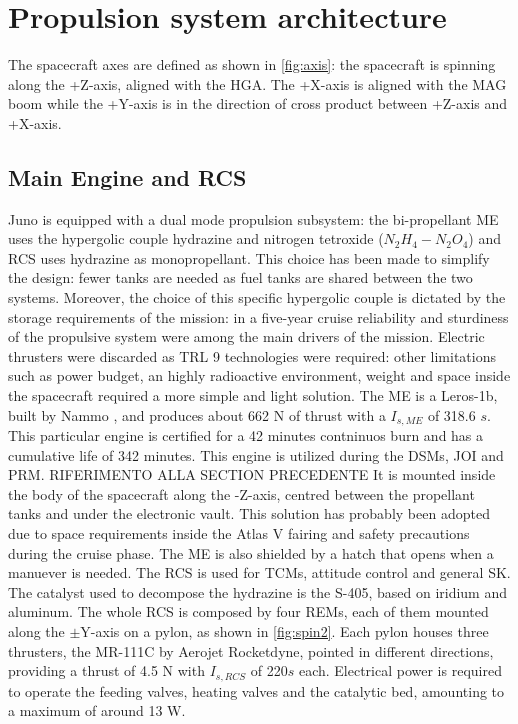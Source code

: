 \section{Propulsion system architecture}
\label{sec:prop_architecture}


The spacecraft axes are defined as shown in \autoref{fig:axis}: the spacecraft is spinning along the +Z-axis, aligned with the HGA. The +X-axis is aligned with the MAG boom while the +Y-axis is in the direction of cross product between +Z-axis and +X-axis.


\subsection{Main Engine and RCS}
\label{sec:me and rcs}

Juno is equipped with a dual mode propulsion subsystem: the bi-propellant ME uses the hypergolic couple hydrazine and nitrogen tetroxide ($N_2H_4 - N_2O_4$) and RCS uses hydrazine as monopropellant. This choice has been made to simplify the design: fewer tanks are needed as fuel tanks are shared between the two systems. Moreover, the choice of this specific hypergolic couple is dictated by the storage requirements of the mission: in a five-year cruise reliability and sturdiness of the propulsive system were among the main drivers of the mission. Electric thrusters were discarded as TRL 9 technologies were required: other limitations such as power budget, an highly radioactive environment, weight and space inside the spacecraft required a more simple and light solution.  
The ME is a Leros-1b, built by Nammo \cite{Leros}, and produces about 662 N of thrust with a $I_{s, ME}$ of 318.6 \;$s$. This particular engine is certified for a 42 minutes contninuos burn and has a cumulative life of 342 minutes.  This engine is utilized during the DSMs, JOI and PRM. RIFERIMENTO ALLA SECTION PRECEDENTE It is mounted inside the body of the spacecraft along the -Z-axis, centred between the propellant tanks and under the electronic vault. This solution has probably been adopted due to space requirements inside the Atlas V fairing and safety precautions during the cruise phase. The ME is also shielded by a hatch that opens when a manuever is needed.
The RCS is used for TCMs, attitude control and general SK. The catalyst used to decompose the hydrazine is the S-405, based on iridium and aluminum\cite{s405}.
The whole RCS is composed by four REMs, each of them mounted along the $\pm$Y-axis on a pylon, as shown in \autoref{fig:spin2}. Each pylon houses three thrusters, the MR-111C by Aerojet Rocketdyne\cite{RCS_info}, pointed in different directions, providing a thrust of 4.5 N with $I_{s, RCS}$ of 220\;$s$ each. Electrical power is required to operate the feeding valves, heating valves and the catalytic bed, amounting to a maximum of around 13 W\cite{RCS_values}. 

